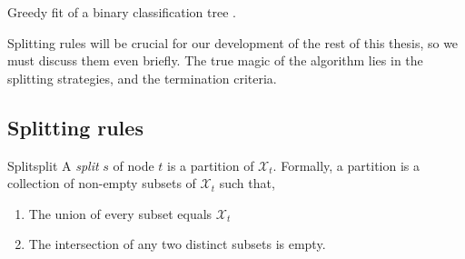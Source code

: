 \begin{algorithm}
    \caption{Greedy fit of a binary classification tree
        \cite[Ch.~3.3]{louppe2014}.}
    \label{alg:tree-fit}
\end{algorithm}

Splitting rules will be crucial for our development of the rest of this thesis,
so we must discuss them even briefly. The true magic of the algorithm lies in
the splitting strategies, and the termination criteria.

\subsection{Splitting rules}

\begin{dfn}{Split}{split}
    A \emph{split} $s$ of node $t$ is a partition of $\mathcal{X}_t$. Formally, a partition is a collection of non-empty subsets of $\mathcal{X}_t$ such that,
    \begin{enumerate}
        \item The union of every subset equals $\mathcal{X}_t$
        \item The intersection of any two distinct subsets is empty.
    \end{enumerate}
\end{dfn}

